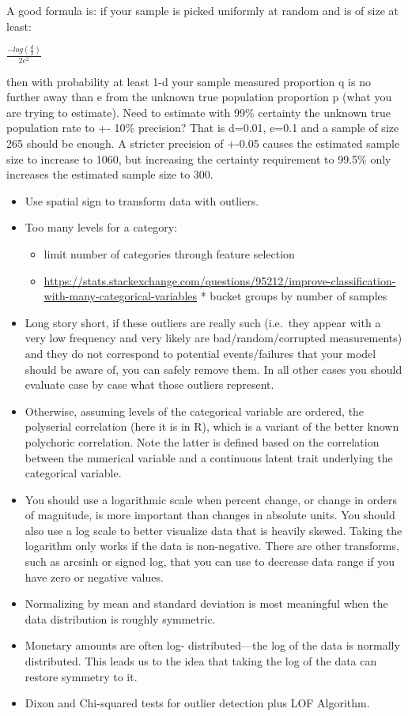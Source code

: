 \documentclass[]{book}
\providecommand{\tightlist}{%
  \setlength{\itemsep}{0pt}\setlength{\parskip}{0pt}}
\begin{document}
A good formula is: if your sample is picked uniformly at random and is
of size at least:

\(\frac{-log(\frac{d}{2})}{2e^2}\)

then with probability at least 1-d your sample measured proportion q is
no further away than e from the unknown true population proportion p
(what you are trying to estimate). Need to estimate with 99\% certainty
the unknown true population rate to +- 10\% precision? That is d=0.01,
e=0.1 and a sample of size 265 should be enough. A stricter precision of
+-0.05 causes the estimated sample size to increase to 1060, but
increasing the certainty requirement to 99.5\% only increases the
estimated sample size to 300.

\begin{itemize}
\item
  Use spatial sign to transform data with outliers.
\item
  Too many levels for a category:

  \begin{itemize}
  \tightlist
  \item
    limit number of categories through feature selection
  \item
    \url{https://stats.stackexchange.com/questions/95212/improve-classification-with-many-categorical-variables}
    * bucket groups by number of samples
  \end{itemize}
\item
  Long story short, if these outliers are really such (i.e.~they appear
  with a very low frequency and very likely are bad/random/corrupted
  measurements) and they do not correspond to potential events/failures
  that your model should be aware of, you can safely remove them. In all
  other cases you should evaluate case by case what those outliers
  represent.
\item
  Otherwise, assuming levels of the categorical variable are ordered,
  the polyserial correlation (here it is in R), which is a variant of
  the better known polychoric correlation. Note the latter is defined
  based on the correlation between the numerical variable and a
  continuous latent trait underlying the categorical variable.
\item
  You should use a logarithmic scale when percent change, or change in
  orders of magnitude, is more important than changes in absolute units.
  You should also use a log scale to better visualize data that is
  heavily skewed. Taking the logarithm only works if the data is
  non-negative. There are other transforms, such as arcsinh or signed
  log, that you can use to decrease data range if you have zero or
  negative values.
\item
  Normalizing by mean and standard deviation is most meaningful when the
  data distribution is roughly symmetric.
\item
  Monetary amounts are often log- distributed---the log of the data is
  normally distributed. This leads us to the idea that taking the log of
  the data can restore symmetry to it.
\item
  Dixon and Chi-squared tests for outlier detection plus LOF Algorithm.
\end{itemize}
\end{document}
